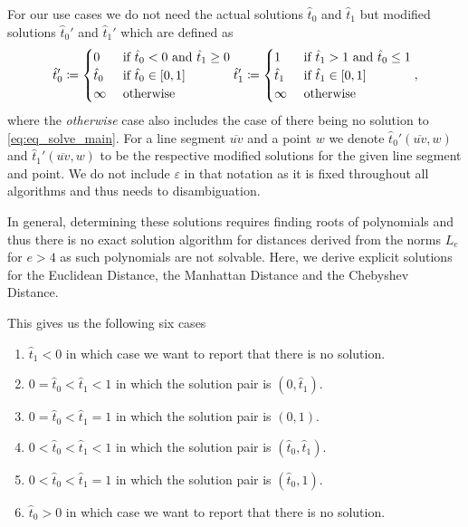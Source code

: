 For our use cases we do not need the actual solutions \(\hat{t}_0\) and \(\hat{t}_1\) but modified solutions \(\hat{t}_0'\) and \(\hat{t}_1'\) which are defined as 
\begin{equation}
  \hat{t}_0' \coloneq \begin{cases}
    0 & \textrm{ if } \hat{t}_0 < 0 \textrm{ and } \hat{t}_1 \geq 0\\
    \hat{t}_0 & \textrm{ if } \hat{t}_0 \in [0, 1]\\
    \infty &\textrm{ otherwise }
  \end{cases}\\
  \hat{t}_1' \coloneq \begin{cases}
    1 & \textrm{ if } \hat{t}_1 > 1 \textrm{ and } \hat{t}_0 \leq 1\\
    \hat{t}_1 & \textrm{ if } \hat{t}_1 \in [0, 1]\\
    \infty &\textrm{ otherwise }
  \end{cases},
\end{equation}
where the \emph{otherwise} case also includes the case of there being no solution to \cref{eq:eq_solve_main}. 
For a line segment \(\overline{uv}\) and a point \(w\) we denote \(\hat t_0'(\overline{uv}, w)\) and \(\hat t_1'(\overline{uv}, w)\) to be the respective modified solutions for the given line segment and point. We do not include \(\varepsilon\) in that notation as it is fixed throughout all algorithms and thus needs to disambiguation.

In general, determining these solutions requires finding roots of polynomials and thus there is no exact solution algorithm for distances derived from the norms \(L_e\) for \(e > 4\) as such polynomials are not solvable. Here, we derive explicit solutions for the Euclidean Distance, the Manhattan Distance and the Chebyshev Distance. 


This gives us the following six cases 
\begin{enumerate}
  \item \(\hat t_1 < 0\) in which case we want to report that there is no solution.
  \item \(0 = \hat t_0 < \hat t_1 < 1\) in which the solution pair is \((0, \hat t_1)\).
  \item \(0 = \hat t_0 < \hat t_1 = 1\) in which the solution pair is \((0, 1)\).
  \item \(0 < \hat t_0 < \hat t_1 < 1\) in which the solution pair is \((\hat t_0, \hat t_1)\).
  \item \(0 < \hat t_0 < \hat t_1 = 1\) in which the solution pair is \((\hat t_0, 1)\).
  \item \(\hat t_0 > 0\) in which case we want to report that there is no solution.
\end{enumerate}

